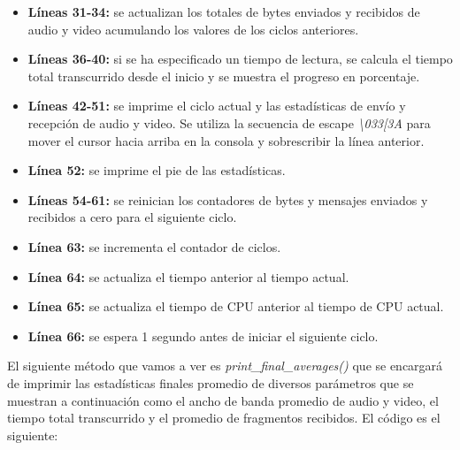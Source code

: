 \begin{itemize}
    \item \textbf{Líneas 31-34:} se actualizan los totales de bytes enviados y recibidos de audio y video acumulando los valores de los ciclos anteriores.
    \item \textbf{Líneas 36-40:} si se ha especificado un tiempo de lectura, se calcula el tiempo total transcurrido desde el inicio y se muestra el progreso en porcentaje.
    \item \textbf{Líneas 42-51:} se imprime el ciclo actual y las estadísticas de envío y recepción de audio y video. Se utiliza la secuencia de escape \textit{\textbackslash 033[3A} para mover el cursor hacia arriba en la consola y sobrescribir la línea anterior.
    \item \textbf{Línea 52:} se imprime el pie de las estadísticas.
    \item \textbf{Líneas 54-61:} se reinician los contadores de bytes y mensajes enviados y recibidos a cero para el siguiente ciclo.
    \item \textbf{Línea 63:} se incrementa el contador de ciclos.
    \item \textbf{Línea 64:} se actualiza el tiempo anterior al tiempo actual.
    \item \textbf{Línea 65:} se actualiza el tiempo de CPU anterior al tiempo de CPU actual.
    \item \textbf{Línea 66:} se espera 1 segundo antes de iniciar el siguiente ciclo.
\end{itemize}
\vspace{\baselineskip}

El siguiente método que vamos a ver es \textit{print\_final\_averages()} que se encargará de imprimir las estadísticas finales promedio de diversos parámetros que se muestran a continuación como el ancho de banda promedio de audio y video, el tiempo total transcurrido y el promedio de fragmentos recibidos. El código es el siguiente:

